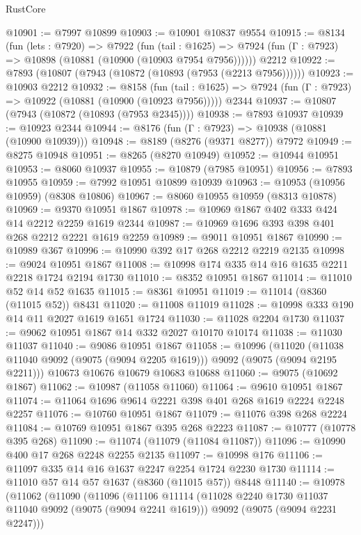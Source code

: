 \begin{lexlean}{RustCore}
\begin{coremodule}
@10901 := @7997 @10899
@10903 := @10901 @10837 @9554
@10915 := @8134
    (fun (lets : @7920) =>
    @7922
      (fun (tail : @1625) =>
      @7924 (fun (Γ : @7923) => @10898 (@10881 (@10900 (@10903 @7954 @7956))))))
    @2212
@10922 := @7893 (@10807 (@7943 (@10872 (@10893 (@7953 (@2213 @7956))))))
@10923 := @10903 @2212
@10932 := @8158
    (fun (tail : @1625) => @7924 (fun (Γ : @7923) => @10922 (@10881 (@10900 (@10923 @7956)))))
    @2344
@10937 := @10807 (@7943 (@10872 (@10893 (@7953 @2345))))
@10938 := @7893 @10937
@10939 := @10923 @2344
@10944 := @8176 (fun (Γ : @7923) => @10938 (@10881 (@10900 @10939)))
@10948 := @8189 (@8276 (@9371 @8277)) @7972
@10949 := @8275 @10948
@10951 := @8265 (@8270 @10949)
@10952 := @10944 @10951
@10953 := @8060 @10937
@10955 := @10879 (@7985 @10951)
@10956 := @7893 @10955
@10959 := @7992 @10951 @10899 @10939
@10963 := @10953 (@10956 @10959) (@8308 @10806)
@10967 := @8060 @10955 @10959 (@8313 @10878)
@10969 := @9370 @10951 @1867
@10978 := @10969 @1867 @402 @333 @424 @14 @2212 @2259 @1619 @2344
@10987 := @10969 @1696 @393 @398 @401 @268 @2212 @2221 @1619 @2259
@10989 := @9011 @10951 @1867
@10990 := @10989 @367
@10996 := @10990 @392 @17 @268 @2212 @2219 @2135
@10998 := @9024 @10951 @1867
@11008 := @10998 @174 @335 @14 @16 @1635 @2211 @2218 @1724 @2194 @1730
@11010 := @8352 @10951 @1867
@11014 := @11010 @52 @14 @52 @1635
@11015 := @8361 @10951
@11019 := @11014 (@8360 (@11015 @52)) @8431
@11020 := @11008 @11019
@11028 := @10998 @333 @190 @14 @11 @2027 @1619 @1651 @1724
@11030 := @11028 @2204 @1730
@11037 := @9062 @10951 @1867 @14 @332 @2027 @10170 @10174
@11038 := @11030 @11037
@11040 := @9086 @10951 @1867
@11058 := @10996
    (@11020 (@11038 @11040 @9092 (@9075 (@9094 @2205 @1619))) @9092 (@9075 (@9094 @2195 @2211)))
    @10673
    @10676
    @10679
    @10683
    @10688
@11060 := @9075 (@10692 @1867)
@11062 := @10987 (@11058 @11060)
@11064 := @9610 @10951 @1867
@11074 := @11064 @1696 @9614 @2221 @398 @401 @268 @1619 @2224 @2248 @2257
@11076 := @10760 @10951 @1867
@11079 := @11076 @398 @268 @2224
@11084 := @10769 @10951 @1867 @395 @268 @2223
@11087 := @10777 (@10778 @395 @268)
@11090 := @11074 (@11079 (@11084 @11087))
@11096 := @10990 @400 @17 @268 @2248 @2255 @2135
@11097 := @10998 @176
@11106 := @11097 @335 @14 @16 @1637 @2247 @2254 @1724 @2230 @1730
@11114 := @11010 @57 @14 @57 @1637 (@8360 (@11015 @57)) @8448
@11140 := @10978
    (@11062
      (@11090
        (@11096
          (@11106
            @11114
            (@11028 @2240 @1730 @11037 @11040 @9092 (@9075 (@9094 @2241 @1619)))
            @9092
            (@9075 (@9094 @2231 @2247)))

\end{coremodule}
\end{lexlean}
